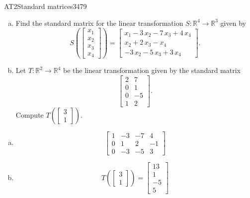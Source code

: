 \begin{exercise}{AT2}{Standard matrices}{3479} 
\begin{exerciseStatement} 

\begin{enumerate}[(a)]
\item Find the standard matrix for the linear transformation \(S:\mathbb{R}^4 \to \mathbb{R}^3\) given by \[S\left( \left[\begin{array}{c}
x_{1} \\
x_{2} \\
x_{3} \\
x_{4}
\end{array}\right] \right) = \left[\begin{array}{c}
x_{1} - 3 \, x_{2} - 7 \, x_{3} + 4 \, x_{4} \\
x_{2} + 2 \, x_{3} - x_{4} \\
-3 \, x_{2} - 5 \, x_{3} + 3 \, x_{4}
\end{array}\right].\] 
\item Let \(T:\mathbb{R}^2 \to \mathbb{R}^4\) be the linear transformation given by the standard matrix \[\left[\begin{array}{cc}
2 & 7 \\
0 & 1 \\
0 & -5 \\
1 & 2
\end{array}\right].\] Compute \(T\left(\left[\begin{array}{c}
3 \\
1
\end{array}\right]\right)\). 
\end{enumerate}

     \end{exerciseStatement}
 \begin{exerciseAnswer} 

\begin{enumerate}[(a)]
\item  \[\left[\begin{array}{cccc}
1 & -3 & -7 & 4 \\
0 & 1 & 2 & -1 \\
0 & -3 & -5 & 3
\end{array}\right]\] 
\item  \[T\left(\left[\begin{array}{c}
3 \\
1
\end{array}\right]\right)=\left[\begin{array}{c}
13 \\
1 \\
-5 \\
5
\end{array}\right]\] 
\end{enumerate}

     \end{exerciseAnswer}
 \end{exercise}


